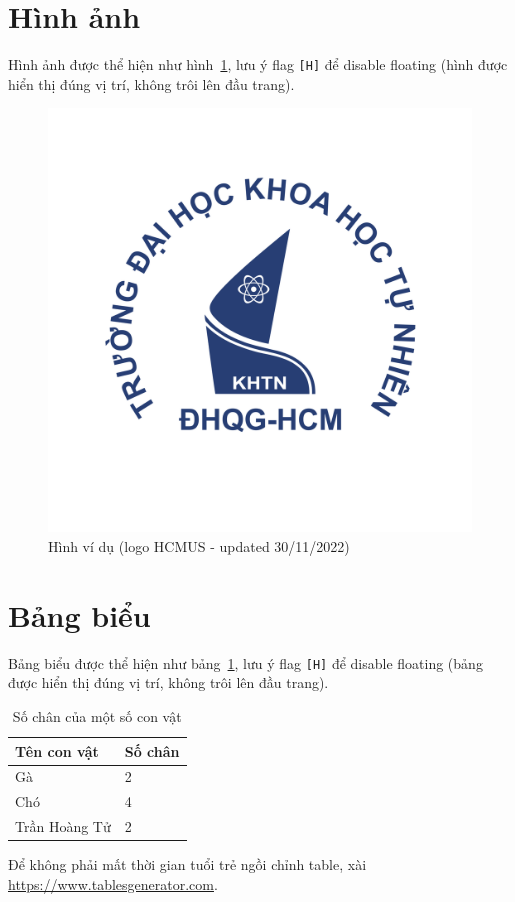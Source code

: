 \documentclass[12pt]{article}
\begin{document}
\section{Hình ảnh}
Hình ảnh được thể hiện như hình~\ref{fig:my_label}, lưu ý flag \texttt{[H]} để disable floating (hình được hiển thị đúng vị trí, không trôi lên đầu trang).
\begin{figure}%
    \centering
    \includegraphics[scale=.4]{img/hcmus-logo.png}
    \caption{Hình ví dụ (logo HCMUS - updated 30/11/2022)}
    \label{fig:my_label}
\end{figure}

\section{Bảng biểu}
Bảng biểu được thể hiện như bảng~\ref{tab:my_label}, lưu ý flag \texttt{[H]} để disable floating (bảng được hiển thị đúng vị trí, không trôi lên đầu trang).
\begin{table}%
\centering
\begin{tabular}{|l|l|}
\hline
\textbf{Tên con vật} & \textbf{Số chân} \\ \hline
Gà & 2 \\ \hline
Chó & 4 \\ \hline
Trần Hoàng Tử & 2 \\ \hline
\end{tabular}
\caption{Số chân của một số con vật}
\label{tab:my_label}
\end{table}
Để không phải mất thời gian tuổi trẻ ngồi chỉnh table, xài \href{https://www.tablesgenerator.com}{https://www.tablesgenerator.com}.
\end{document}
